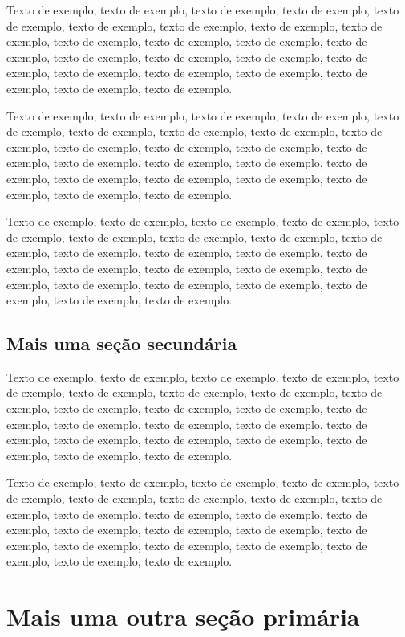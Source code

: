 \documentclass[
	12pt,				%
	oneside,			%
	a4paper,			%
	english,			%
	brazil				%
	]{abntex2ppgsi}
\begin{document}
Texto de exemplo, texto de exemplo, texto de exemplo, texto de exemplo, texto de exemplo, texto de exemplo, texto de exemplo, texto de exemplo, texto de exemplo, texto de exemplo, texto de exemplo, texto de exemplo, texto de exemplo, texto de exemplo, texto de exemplo, texto de exemplo, texto de exemplo, texto de exemplo, texto de exemplo, texto de exemplo, texto de exemplo, texto de exemplo, texto de exemplo.

Texto de exemplo, texto de exemplo, texto de exemplo, texto de exemplo, texto de exemplo, texto de exemplo, texto de exemplo, texto de exemplo, texto de exemplo, texto de exemplo, texto de exemplo, texto de exemplo, texto de exemplo, texto de exemplo, texto de exemplo, texto de exemplo, texto de exemplo, texto de exemplo, texto de exemplo, texto de exemplo, texto de exemplo, texto de exemplo, texto de exemplo.

Texto de exemplo, texto de exemplo, texto de exemplo, texto de exemplo, texto de exemplo, texto de exemplo, texto de exemplo, texto de exemplo, texto de exemplo, texto de exemplo, texto de exemplo, texto de exemplo, texto de exemplo, texto de exemplo, texto de exemplo, texto de exemplo, texto de exemplo, texto de exemplo, texto de exemplo, texto de exemplo, texto de exemplo, texto de exemplo, texto de exemplo.

\section{Mais uma seção secundária}

Texto de exemplo, texto de exemplo, texto de exemplo, texto de exemplo, texto de exemplo, texto de exemplo, texto de exemplo, texto de exemplo, texto de exemplo, texto de exemplo, texto de exemplo, texto de exemplo, texto de exemplo, texto de exemplo, texto de exemplo, texto de exemplo, texto de exemplo, texto de exemplo, texto de exemplo, texto de exemplo, texto de exemplo, texto de exemplo, texto de exemplo.

Texto de exemplo, texto de exemplo, texto de exemplo, texto de exemplo, texto de exemplo, texto de exemplo, texto de exemplo, texto de exemplo, texto de exemplo, texto de exemplo, texto de exemplo, texto de exemplo, texto de exemplo, texto de exemplo, texto de exemplo, texto de exemplo, texto de exemplo, texto de exemplo, texto de exemplo, texto de exemplo, texto de exemplo, texto de exemplo, texto de exemplo.

\chapter{Mais uma outra seção primária}
\end{document}
